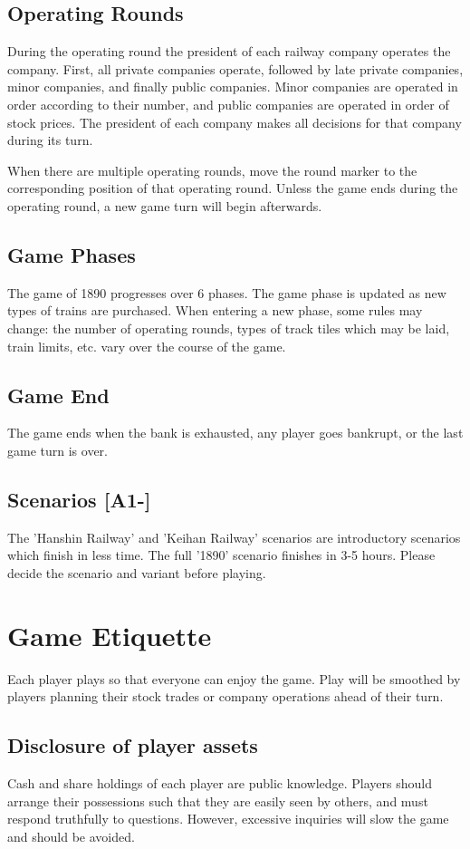 \documentclass{article}
\begin{document}
\begin{CJK}{UTF8}{min}
\begin{multicols}{2}
\subsection{Operating Rounds}
During the operating round the president of each railway company
operates the company. First, all private companies operate, followed
by late private companies, minor companies, and finally public
companies. Minor companies are operated in order according to their
number, and public companies are operated in order of stock
prices. The president of each company makes all decisions for that
company during its turn.

When there are multiple operating rounds, move the round marker to the
corresponding position of that operating round. Unless the game ends during
the operating round, a new game turn will begin afterwards.

\subsection{Game Phases}
The game of 1890 progresses over 6 phases. The game phase is updated
as new types of trains are purchased. When entering a new phase, some
rules may change: the number of operating rounds, types of track tiles
which may be laid, train limits, etc. vary over the course of the
game.


\subsection{Game End}
The game ends when the bank is exhausted, any player goes bankrupt,
or the last game turn is over.


\subsection{Scenarios [A1-]}
The 'Hanshin Railway' and 'Keihan Railway' scenarios are introductory
scenarios which finish in less time. The full '1890' scenario finishes
in 3-5 hours. Please decide the scenario and variant before playing.


\section{Game Etiquette}
Each player plays so that everyone can enjoy the game. Play will be
smoothed by players planning their stock trades or company operations
ahead of their turn.


\subsection{Disclosure of player assets}
\label{player-cash}
Cash and share holdings of each player are public knowledge. Players
should arrange their possessions such that they are easily seen by
others, and must respond truthfully to questions. However, excessive
inquiries will slow the game and should be avoided.



\end{multicols}
\end{CJK}
\end{document}
